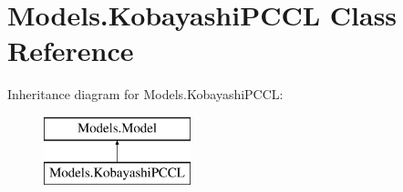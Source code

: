\hypertarget{classModels_1_1KobayashiPCCL}{\section{\-Models.\-Kobayashi\-P\-C\-C\-L \-Class \-Reference}
\label{classModels_1_1KobayashiPCCL}
}
\-Inheritance diagram for \-Models.\-Kobayashi\-P\-C\-C\-L\-:\begin{figure}[H]
\begin{center}
\leavevmode
\includegraphics[height=2.000000cm]{classModels_1_1KobayashiPCCL}
\end{center}
\end{figure}

